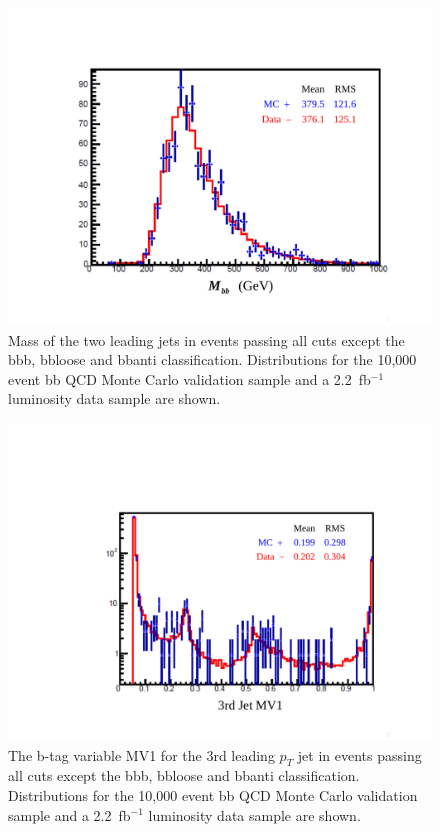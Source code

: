\begin{figure}
  \center
  \includegraphics[width=0.70\linewidth]{MonteCarlo/figures/mbb_bbqcd_vs_data.pdf}
  \caption{Mass of the two leading jets in events passing all cuts except the
bbb, bbloose and bbanti classification.  Distributions for the 10,000 event bb QCD Monte Carlo validation sample
and a 2.2~fb$^{-1}$ luminosity data sample are shown.    \label{fig:mbb_bbqcd_vs_data}}
\end{figure}

\begin{figure}
  \center
  \includegraphics[width=0.70\linewidth]{MonteCarlo/figures/mv1_jet3_bbqcd_vs_data.pdf}
  \caption{The b-tag variable MV1 for the 3rd leading $p_T$ jet in events passing all cuts except the
bbb, bbloose and bbanti classification.     Distributions for the 10,000 event bb QCD Monte Carlo validation sample
and a 2.2~fb$^{-1}$ luminosity data sample are shown.    \label{fig:mv1_jet3_bbqcd_vs_data}}
\end{figure}




